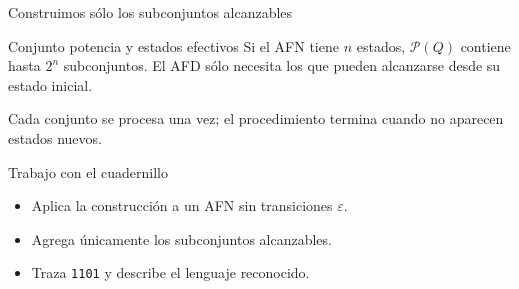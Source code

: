 \documentclass[11pt,spanish]{beamer}
\newcommand{\actividad}[1]{\textbf{\textcolor{Rojo}{#1}}}
\begin{document}
\begin{frame}{Construimos sólo los subconjuntos alcanzables}
\vfill

\begin{center}
\end{center}

\bigskip
\begin{block}{Conjunto potencia y estados efectivos}
Si el AFN tiene \(n\) estados, \(\mathcal{P}(Q)\) contiene hasta \(2^n\) subconjuntos. El AFD sólo necesita los que pueden alcanzarse desde su estado inicial.
\end{block}

\bigskip
\begin{center}
\small Cada conjunto se procesa una vez; el procedimiento termina cuando no aparecen estados nuevos.
\end{center}

\vfill
\end{frame}

\begin{frame}{Trabajo con el cuadernillo}
\vfill

\begin{center}
\end{center}

\bigskip
\begin{itemize}
\item Aplica la construcción a un AFN sin transiciones \(\varepsilon\).
\item Agrega únicamente los subconjuntos alcanzables.
\item Traza \texttt{1101} y describe el lenguaje reconocido.
\end{itemize}

\vfill
\end{frame}
\end{document}

